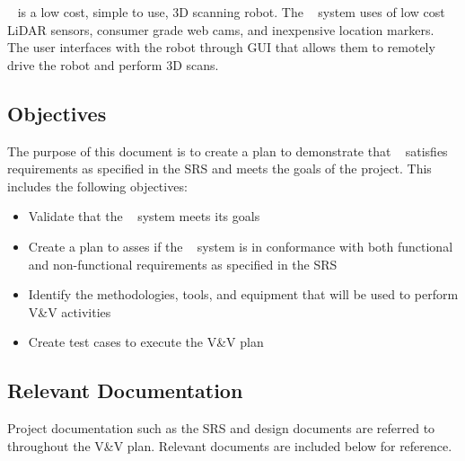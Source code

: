 \documentclass[12pt, titlepage]{article}
\begin{document}
  \progname~ is a low cost, simple to use, 3D scanning robot. The \progname~ system uses of low cost LiDAR sensors, consumer grade web cams, and inexpensive location markers. The user interfaces with the robot through GUI that allows them to remotely drive the robot and perform 3D scans.

\subsection{Objectives}

  
The purpose of this document is to create a plan to demonstrate that \progname~ satisfies requirements as specified in the SRS and meets the goals of the project. This includes the following objectives:
  
\begin{itemize}
  \item Validate that the \progname~ system meets its goals
  \item Create a plan to asses if the \progname~ system is in conformance with both functional and non-functional requirements as specified in the SRS
  \item Identify the methodologies, tools, and equipment that will be used to perform V\&V activities
  \item Create test cases to execute the V\&V plan
\end{itemize}

\subsection{Relevant Documentation}

  
Project documentation such as the SRS and design documents are referred to throughout the V\&V plan. Relevant documents are included below for reference.
\end{document}
